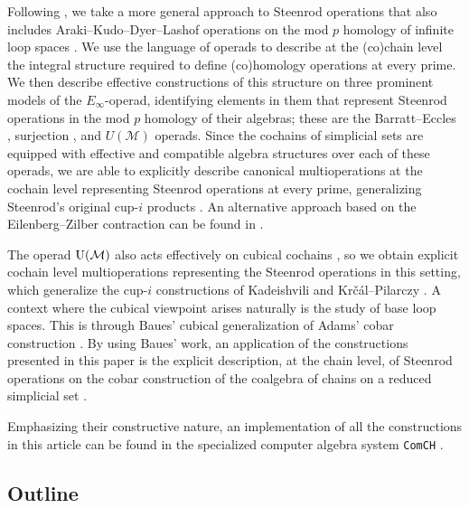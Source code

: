 Following \cite{may1970general}, we take a more general approach to Steenrod operations that also includes Araki--Kudo--Dyer--Lashof operations on the mod $p$ homology of infinite loop spaces \cite{araki56squaring, dyer62lashof}.
We use the language of operads \cite{may1972geometry} to describe at the (co)chain level the integral structure required to define (co)homology operations at every prime.
We then describe effective constructions of this structure on three prominent models of the $E_\infty$-operad, identifying elements in them that represent Steenrod operations in the mod $p$ homology of their algebras; these are the Barratt--Eccles \cite{berger2004combinatorial}, surjection \cite{mcclure2003multivariable}, and $U(\mathcal M)$ \cite{medina2020prop1} operads.
Since the cochains of simplicial sets are equipped with effective and compatible algebra structures over each of these operads, we are able to explicitly describe canonical multioperations at the cochain level representing Steenrod operations at every prime, generalizing Steenrod's original cup-$i$ products \cite{steenrod1947products}.
An alternative approach based on the Eilenberg--Zilber contraction can be found in \cite{gonzalez2005cocyclic}.

The operad ${\operatorname{U}(\mathcal{M})}$ also acts effectively on cubical cochains \cite{medina2021cubical}, so we obtain explicit cochain level multioperations representing the Steenrod operations in this setting, which generalize the cup-$i$ constructions of Kadeishvili \cite{kadeishvili2003cupi} and Kr\v{c}\'{a}l--Pilarczy \cite{pilarczyk2016cubical}.
A context where the cubical viewpoint arises naturally is the study of base loop spaces.
This is through Baues' cubical generalization of Adams' cobar construction \cite{adams1956cobar, baues1998hopf}.
By using Baues' work, an application of the constructions presented in this paper is the explicit description, at the chain level, of Steenrod operations on the cobar construction of the coalgebra of chains on a reduced simplicial set \cite{medina2021cobar}.

Emphasizing their constructive nature, an implementation of all the constructions in this article can be found in the specialized computer algebra system \texttt{ComCH} \cite{medina2021computer}.

\subsection*{Outline}

